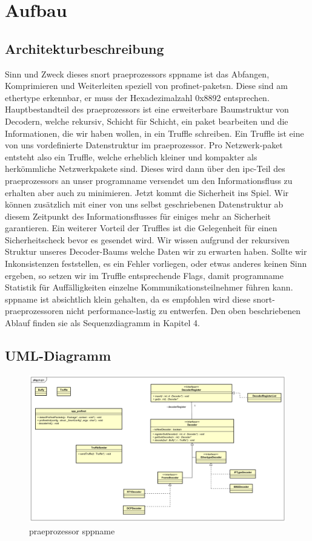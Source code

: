 \chapter{Aufbau \sppname}

\section{Architekturbeschreibung}

Sinn und Zweck dieses \gls{snort} \gls{praeprozessor}s \gls{sppname} ist das Abfangen,
Komprimieren und Weiterleiten speziell von \gls{profinet}-\glspl{paket}n. Diese
sind am \gls{ethertype} erkennbar, er muss der Hexadezimalzahl 0x8892 entsprechen.
Hauptbestandteil des \gls{praeprozessor}s ist eine erweiterbare Baumstruktur von Decodern, welche rekursiv, Schicht für Schicht, ein \gls{paket} bearbeiten und die Informationen, die wir haben wollen, in ein Truffle schreiben. Ein Truffle ist eine von uns vordefinierte Datenstruktur im \gls{praeprozessor}.
Pro Netzwerk-\gls{paket} entsteht also ein Truffle, welche erheblich kleiner und kompakter als herkömmliche Netzwerkpakete sind. Dieses wird dann über den \gls{ipc}-Teil des \gls{praeprozessor}s
an unser \gls{programname} versendet um den Informationsfluss zu erhalten aber auch zu minimieren.\newline
Jetzt kommt die Sicherheit ins Spiel. Wir können zusätzlich mit einer von uns selbst geschriebenen Datenstruktur ab diesem Zeitpunkt des Informationsflusses für einiges mehr an Sicherheit garantieren.
Ein weiterer Vorteil der Truffles ist die Gelegenheit für einen Sicherheitscheck bevor es gesendet wird. Wir wissen aufgrund der rekursiven Struktur unseres Decoder-Baums welche Daten wir zu erwarten haben. Sollte wir Inkonsistenzen feststellen, es ein Fehler vorliegen, oder etwas anderes keinen Sinn ergeben, so setzen wir im Truffle entsprechende Flags, damit \gls{programname} Statistik für Auffälligkeiten einzelne Kommunikationsteilnehmer führen kann.\newline
\gls{sppname} ist absichtlich klein gehalten, da es empfohlen wird diese \gls{snort}-\gls{praeprozessor}en nicht performance-lastig zu entwerfen. Den oben beschriebenen Ablauf finden sie als Sequenzdiagramm in Kapitel 4.


\section{UML-Diagramm}

\begin{figure}
  \centering
  \includegraphics[width=\paperwidth]{../diagramimages/spp_profinet.png}
  \caption{\gls{praeprozessor} \gls{sppname}}
\end{figure}

